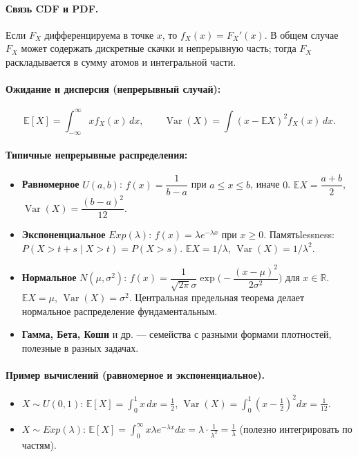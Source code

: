 \paragraph{Связь CDF и PDF.} Если $F_X$ дифференцируема в точке $x$, то $f_X(x)=F_X'(x)$. В общем случае $F_X$ может содержать дискретные скачки и непрерывную часть; тогда $F_X$ раскладывается в сумму атомов и интегральной части.

\paragraph{Ожидание и дисперсия (непрерывный случай):}
\[
\mathbb{E}[X] = \int_{-\infty}^{\infty} x f_X(x)\,dx,\qquad
\operatorname{Var}(X) = \int (x-\mathbb{E}X)^2 f_X(x)\,dx.
\]

\paragraph{Типичные непрерывные распределения:}
\begin{itemize}
  \item \textbf{Равномерное} $U(a,b)$: $f(x)=\dfrac{1}{b-a}$ при $a\le x\le b$, иначе $0$. $\mathbb{E}X=\dfrac{a+b}{2}$, $\operatorname{Var}(X)=\dfrac{(b-a)^2}{12}$.
  \item \textbf{Экспоненциальное} $Exp(\lambda)$: $f(x)=\lambda e^{-\lambda x}$ при $x\ge0$. Памятьlessness: $P(X>t+s\mid X>t)=P(X>s)$. $\mathbb{E}X=1/\lambda$, $\operatorname{Var}(X)=1/\lambda^2$.
  \item \textbf{Нормальное} $N(\mu,\sigma^2)$: $f(x)=\dfrac{1}{\sqrt{2\pi}\sigma}\exp\bigl(-\dfrac{(x-\mu)^2}{2\sigma^2}\bigr)$ для $x\in\mathbb{R}$. $\mathbb{E}X=\mu$, $\operatorname{Var}(X)=\sigma^2$. Центральная предельная теорема делает нормальное распределение фундаментальным.
  \item \textbf{Гамма, Бета, Коши} и др. — семейства с разными формами плотностей, полезные в разных задачах.
\end{itemize}

\paragraph{Пример вычислений (равномерное и экспоненциальное).}
\begin{itemize}
  \item $X\sim U(0,1)$: $\mathbb{E}[X]=\int_0^1 x\,dx=\tfrac12$, $\operatorname{Var}(X)=\int_0^1 (x-\tfrac12)^2 dx=\tfrac{1}{12}$.
  \item $X\sim Exp(\lambda)$: $\mathbb{E}[X]=\int_0^\infty x\lambda e^{-\lambda x}dx = \lambda\cdot \frac{1}{\lambda^2} = \frac{1}{\lambda}$ (полезно интегрировать по частям).
\end{itemize}

